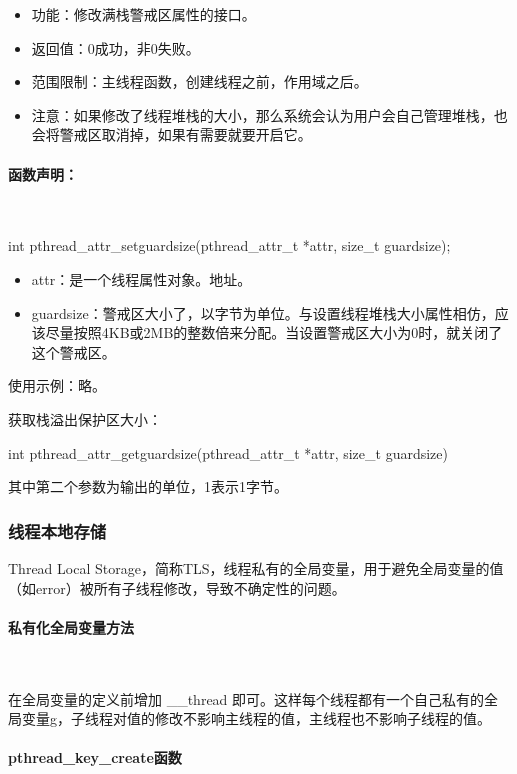 \documentclass[UTF8]{article}%
\begin{document}
\begin{itemize}
    \item 功能：修改满栈警戒区属性的接口。
    \item 返回值：0成功，非0失败。
    \item 范围限制：主线程函数，创建线程之前，作用域之后。
    \item 注意：如果修改了线程堆栈的大小，那么系统会认为用户会自己管理堆栈，也会将警戒区取消掉，如果有需要就要开启它。 
\end{itemize}

\paragraph{函数声明：}~{}

int pthread\_attr\_setguardsize(pthread\_attr\_t *attr, size\_t guardsize); 

\begin{itemize}
    \item attr：是一个线程属性对象。地址。
    \item guardsize：警戒区大小了，以字节为单位。与设置线程堆栈大小属性相仿，应该尽量按照4KB或2MB的整数倍来分配。当设置警戒区大小为0时，就关闭了这个警戒区。 
\end{itemize}

使用示例：略。

获取栈溢出保护区大小：

int pthread\_attr\_getguardsize(pthread\_attr\_t *attr, size\_t guardsize)

其中第二个参数为输出的单位，1表示1字节。

\subsubsection{线程本地存储}

Thread Local Storage，简称TLS，线程私有的全局变量，用于避免全局变量的值（如error）被所有子线程修改，导致不确定性的问题。

\paragraph{私有化全局变量方法}~{}

在全局变量的定义前增加 \_\_thread 即可。这样每个线程都有一个自己私有的全局变量g，子线程对值的修改不影响主线程的值，主线程也不影响子线程的值。


\paragraph{pthread\_key\_create函数}~{}
\end{document}

